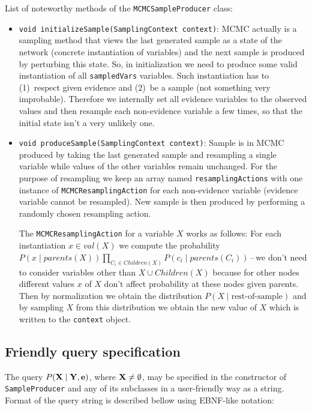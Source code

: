 \documentclass[english,cover]{fitthesis} %
\newcommand{\srccode}[1]{{\tt #1}}         %
\newcommand{\vars}[1]{{\bold{#1}}}         %
\begin{document}
\medskip
List of noteworthy methods of the \srccode{MCMCSampleProducer} class:
\begin{itemize}
	\item \srccode{void initializeSample(SamplingContext context)}: MCMC actually is a sampling method that views the last generated sample as a state of the network (concrete instantiation of variables) and the next sample is produced by perturbing this state. So, in initialization we need to produce some valid instantiation of all \srccode{sampledVars} variables. Such instantiation has to (1)~respect given evidence and (2)~be a  sample (not something very improbable). Therefore we internally set all evidence variables to the observed values and then resample each non-evidence variable a few times, so that the initial state isn't a very unlikely one.
	\item \srccode{void produceSample(SamplingContext context)}: Sample is in MCMC produced by taking the last generated sample and resampling a single variable while values of the other variables remain unchanged. For the purpose of resampling we keep an array named \srccode{resamplingActions} with one instance of \srccode{MCMCResamplingAction} for each non-evidence variable (evidence variable cannot be resampled). New sample is then produced by performing a randomly chosen resampling action.
	
	The \srccode{MCMCResamplingAction} for a variable $X$ works as follows: For each instantiation $x \in val(X)$ we compute the probability $P(x \mid parents(X)) \prod_{C_i \in Children(X)} P(c_i \mid parents(C_i))$\,--\,we don't need to consider variables other than $X \cup Children(X)$ because for other nodes different values $x$ of $X$ don't affect probability at these nodes given parents. Then by normalization we obtain the distribution $P(X \mid \text{rest-of-sample})$ and by sampling $X$ from this distribution we obtain the new value of $X$ which is written to the \srccode{context} object.
\end{itemize}


\subsection{Friendly query specification}
The query $P(\vars{X} \mid \vars{Y}, \vars{e})$, where $\vars{X} \neq \emptyset$, may be specified in the constructor of \srccode{SampleProducer} and any of its subclasses in a user-friendly way as a string. Format of the query string is described bellow using EBNF-like notation:
\end{document}

